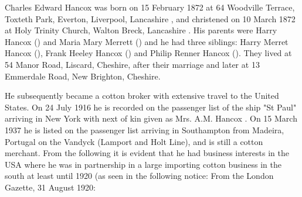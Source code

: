 
Charles Edward Hancox was born on 15 February 1872 at 64 Woodville Terrace, Toxteth Park, Everton, Liverpool, Lancashire \cite{CEHancoxBirth},  and christened on 10 March 1872 at Holy Trinity Church, Walton Breck, Lancashire \cite{CEHancoxBaptism}. His parents were Harry Hancox () and Maria Mary Merrett () and he had three siblings: Harry Merret Hancox (), Frank Heeley Hancox () and Philip Renner Hancox ().
They lived at 54 Manor Road, Liscard, Cheshire, after their marriage\cite{CharlesEdwardHancoxHouse} and later at 13 Emmerdale Road, New Brighton, Cheshire. 

He subsequently became a cotton broker with extensive travel to the United States.  On 24 July 1916 he is recorded on the passenger list of the ship "St Paul" arriving in New York with next of kin given as Mrs. A.M. Hancox \cite{CEHancoxTravel}. On 15 March 1937 he is listed on the passenger list arriving in Southampton from Madeira, Portugal on the Vandyck (Lamport and Holt Line), and is still a cotton merchant. From the following it is evident that he had business interests in the USA where he was in partnership in a large importing cotton business in the south \cite{CEHancoxOccupation2} at least until 1920 (as seen in the following notice:
From the London Gazette, 31 August 1920:

